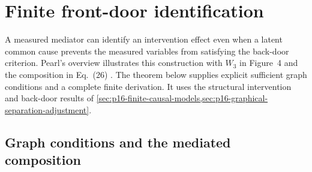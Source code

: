 \section{Finite front-door identification}
\label{sec:p16-front-door-identification}

A measured mediator can identify an intervention effect even when a
latent common cause prevents the measured variables from satisfying the
back-door criterion. Pearl's overview illustrates this construction with
\(W_3\) in Figure~4 and the composition in Eq.~(26)
\cite[sec.~3.3.2, p.~116]{Pearl2009CausalOverview}.
The theorem below supplies explicit sufficient graph conditions and a
complete finite derivation. It uses the structural intervention and
back-door results of
\cref{sec:p16-finite-causal-models,sec:p16-graphical-separation-adjustment}.

\subsection{Graph conditions and the mediated composition}

